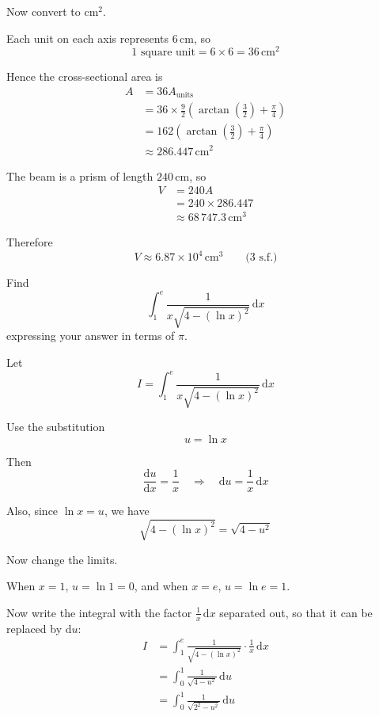 \documentclass[leqno]{article}
\begin{document}
\begin{enumerate}[
  label=\textbf{\arabic*.},
  leftmargin=*,
  topsep=0pt,
  partopsep=0pt,
  parsep=0pt
]
\begin{djsSolution}
Now convert to $\mathrm{cm}^2$.

Each unit on each axis represents $6\,\mathrm{cm}$, so
\[
1\text{ square unit}=6\times 6=36\,\mathrm{cm}^2
\]

Hence the cross-sectional area is
\begin{align*}
A
&=36A_{\text{units}} \\
&=36\times\frac{9}{2}\left(\arctan\left(\frac{3}{2}\right)+\frac{\pi}{4}\right) \\
&=162\left(\arctan\left(\frac{3}{2}\right)+\frac{\pi}{4}\right) \\
&\approx 286.447\,\mathrm{cm}^2
\end{align*}

The beam is a prism of length $240\,\mathrm{cm}$, so
\begin{align*}
V&=240A \\
&=240\times 286.447 \\
&\approx 68\,747.3\,\mathrm{cm}^3
\end{align*}

Therefore
\[
V\approx 6.87\times 10^4\,\mathrm{cm}^3\qquad\text{(3 s.f.)}
\]
\end{djsSolution}


\newpage

\questionitem

Find
\[
\int_1^{e} \frac{1}{x\sqrt{4-(\ln x)^2}} \, \mathrm{d}x
\]
expressing your answer in terms of $\pi$. 

\vspace*{10pt}

\begin{djsSolution}
Let
\[
I=\int_1^{e} \frac{1}{x\sqrt{4-(\ln x)^2}}\,\mathrm{d}x
\]

Use the substitution
\[
u=\ln x
\]

Then
\[
\frac{\mathrm{d}u}{\mathrm{d}x}=\frac{1}{x}
\quad\Longrightarrow\quad
\mathrm{d}u=\frac{1}{x}\,\mathrm{d}x
\]

Also, since \(\ln x=u\), we have
\[
\sqrt{4-(\ln x)^2}=\sqrt{4-u^2}
\]

Now change the limits.

When \(x=1\), \(u=\ln 1=0\), and when \(x=e\), \(u=\ln e=1\).

Now write the integral with the factor \(\frac{1}{x}\,\mathrm{d}x\) separated out, so that it can be replaced by \(\mathrm{d}u\):
\begin{align*}
I
&=\int_1^{e} \frac{1}{\sqrt{4-(\ln x)^2}}\cdot\frac{1}{x}\,\mathrm{d}x \\
&=\int_0^{1} \frac{1}{\sqrt{4-u^2}}\,\mathrm{d}u \\
&=\int_0^{1} \frac{1}{\sqrt{2^2-u^2}}\,\mathrm{d}u
\end{align*}


\end{djsSolution}
\end{enumerate}
\end{document}
